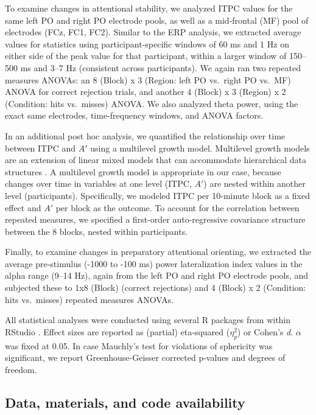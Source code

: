 \documentclass[11pt,english,]{memoir}
\begin{document}
To examine changes in attentional stability, we analyzed ITPC values for the same left PO and right PO electrode pools, as well as a mid-frontal (MF) pool of electrodes (FCz, FC1, FC2). Similar to the ERP analysis, we extracted average values for statistics using participant-specific windows of 60 ms and 1 Hz on either side of the peak value for that participant, within a larger window of 150--500 ms and 3--7 Hz (consistent across participants). We again ran two repeated measures ANOVAs: an 8 (Block) x 3 (Region: left PO vs.~right PO vs.~MF) ANOVA for correct rejection trials, and another 4 (Block) x 3 (Region) x 2 (Condition: hits vs.~misses) ANOVA. We also analyzed theta power, using the exact same electrodes, time-frequency windows, and ANOVA factors.

In an additional post hoc analysis, we quantified the relationship over time between ITPC and \(A'\) using a multilevel growth model. Multilevel growth models are an extension of linear mixed models that can accommodate hierarchical data structures \autocite[see e.g.][]{Kristjansson2007}. A multilevel growth model is appropriate in our case, because changes over time in variables at one level (ITPC, \(A'\)) are nested within another level (participants). Specifically, we modeled ITPC per 10-minute block as a fixed effect and \(A'\) per block as the outcome. To account for the correlation between repeated measures, we specified a first-order auto-regressive covariance structure between the 8 blocks, nested within participants.

Finally, to examine changes in preparatory attentional orienting, we extracted the average pre-stimulus (-1000 to -100 ms) power lateralization index values in the alpha range (9--14 Hz), again from the left PO and right PO electrode pools, and subjected these to 1x8 (Block) (correct rejections) and 4 (Block) x 2 (Condition: hits vs.~misses) repeated measures ANOVAs.

All statistical analyses were conducted using several R \autocite{R-base} packages \autocites{R-ez}{R-BayesFactor}{R-nlme}{R-broom}{R-tidyverse} from within RStudio \autocite{RStudio2016}. Effect sizes are reported as (partial) eta-squared (\(\eta^{2}_{p}\)) or Cohen's \emph{d}. \(\alpha\) was fixed at 0.05. In case Mauchly's test for violations of sphericity was significant, we report Greenhouse-Geisser corrected p-values and degrees of freedom.

\hypertarget{data-materials-and-code-availability-3}{%
\subsection{Data, materials, and code availability}\label{data-materials-and-code-availability-3}}
\end{document}
